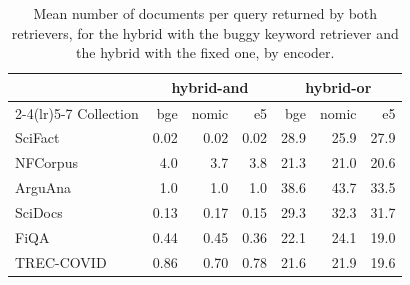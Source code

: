 \documentclass[11pt]{article}
\begin{document}
\begin{table}[h]
\centering
\small
\begin{tabular}{lrrrrrr}
\toprule
 & \multicolumn{3}{c}{hybrid-and} & \multicolumn{3}{c}{hybrid-or} \\
\cmidrule(lr){2-4}\cmidrule(lr){5-7}
Collection & bge & nomic & e5 & bge & nomic & e5 \\
\midrule
SciFact & 0.02 & 0.02 & 0.02 & 28.9 & 25.9 & 27.9 \\
NFCorpus & 4.0 & 3.7 & 3.8 & 21.3 & 21.0 & 20.6 \\
ArguAna & 1.0 & 1.0 & 1.0 & 38.6 & 43.7 & 33.5 \\
SciDocs & 0.13 & 0.17 & 0.15 & 29.3 & 32.3 & 31.7 \\
FiQA & 0.44 & 0.45 & 0.36 & 22.1 & 24.1 & 19.0 \\
TREC-COVID & 0.86 & 0.70 & 0.78 & 21.6 & 21.9 & 19.6 \\
\bottomrule
\end{tabular}
\caption{Mean number of documents per query returned by both retrievers, for the hybrid with the buggy keyword retriever and the hybrid with the fixed one, by encoder.}
\label{tab:shared}
\end{table}
\end{document}

